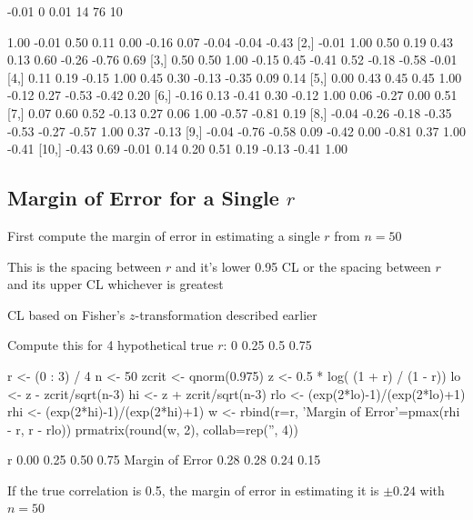 \begin{Schunk}
\begin{Soutput}
-0.01     0  0.01 
   14    76    10 
\end{Soutput}
\begin{Soutput}
       [,1]  [,2]  [,3]  [,4]  [,5]  [,6]  [,7]  [,8]  [,9] [,10]
 [1,]  1.00 -0.01  0.50  0.11  0.00 -0.16  0.07 -0.04 -0.04 -0.43
 [2,] -0.01  1.00  0.50  0.19  0.43  0.13  0.60 -0.26 -0.76  0.69
 [3,]  0.50  0.50  1.00 -0.15  0.45 -0.41  0.52 -0.18 -0.58 -0.01
 [4,]  0.11  0.19 -0.15  1.00  0.45  0.30 -0.13 -0.35  0.09  0.14
 [5,]  0.00  0.43  0.45  0.45  1.00 -0.12  0.27 -0.53 -0.42  0.20
 [6,] -0.16  0.13 -0.41  0.30 -0.12  1.00  0.06 -0.27  0.00  0.51
 [7,]  0.07  0.60  0.52 -0.13  0.27  0.06  1.00 -0.57 -0.81  0.19
 [8,] -0.04 -0.26 -0.18 -0.35 -0.53 -0.27 -0.57  1.00  0.37 -0.13
 [9,] -0.04 -0.76 -0.58  0.09 -0.42  0.00 -0.81  0.37  1.00 -0.41
[10,] -0.43  0.69 -0.01  0.14  0.20  0.51  0.19 -0.13 -0.41  1.00
\end{Soutput}
\end{Schunk}
\ei

\subsection{Margin of Error for a Single $r$}
\bi
\item First compute the margin of error in estimating a single $r$ from $n=50$
\item This is the spacing between $r$ and it's lower 0.95 CL or the spacing between $r$ and its upper CL whichever is greatest
\item CL based on Fisher's $z$-transformation described earlier
\item Compute this for 4 hypothetical true $r$: 0 0.25 0.5 0.75
\begin{Schunk}
\begin{Sinput}
r <- (0 : 3) / 4
n <- 50
zcrit <- qnorm(0.975)
z <- 0.5 * log( (1 + r) / (1 - r))
lo <- z - zcrit/sqrt(n-3)
hi <- z + zcrit/sqrt(n-3)
rlo <- (exp(2*lo)-1)/(exp(2*lo)+1)
rhi <- (exp(2*hi)-1)/(exp(2*hi)+1)
w <- rbind(r=r, 'Margin of Error'=pmax(rhi - r, r - rlo))
prmatrix(round(w, 2), collab=rep('', 4))
\end{Sinput}
\begin{Soutput}
                                   
r               0.00 0.25 0.50 0.75
Margin of Error 0.28 0.28 0.24 0.15
\end{Soutput}
\end{Schunk}
\item If the true correlation is 0.5, the margin of error in estimating it is $$ with $n=50$
\ei

